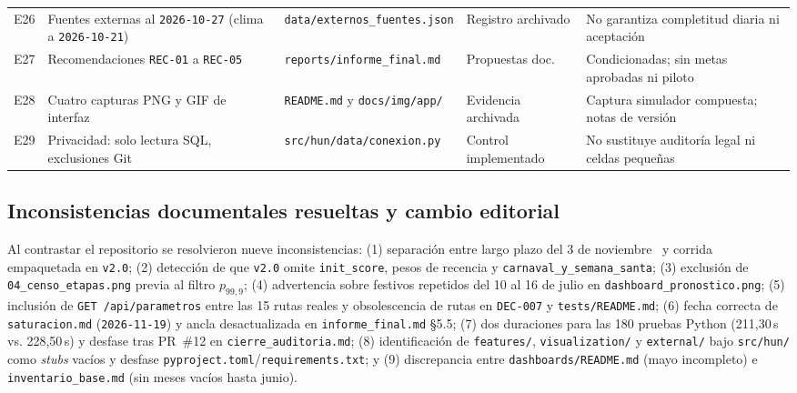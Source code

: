 \begin{table}[t]
\begin{tabularx}{\textwidth}{@{}L{0.04\textwidth} L{0.27\textwidth} L{0.24\textwidth} L{0.15\textwidth} Y@{}}
E26 & Fuentes externas al \texttt{2026-10-27} (clima a \texttt{2026-10-21}) & \nolinkurl{data/externos_fuentes.json} & Registro archivado & No garantiza completitud diaria ni aceptación \\
E27 & Recomendaciones \texttt{REC-01} a \texttt{REC-05} & \nolinkurl{reports/informe_final.md} & Propuestas doc. & Condicionadas; sin metas aprobadas ni piloto \\
E28 & Cuatro capturas PNG y GIF de interfaz & \nolinkurl{README.md} y \nolinkurl{docs/img/app/} & Evidencia archivada & Captura simulador compuesta; notas de versión \\
E29 & Privacidad: solo lectura SQL, exclusiones Git & \nolinkurl{src/hun/data/conexion.py} & Control implementado & No sustituye auditoría legal ni celdas pequeñas \\
\bottomrule
\end{tabularx}
\end{table}

\subsection{Inconsistencias documentales resueltas y cambio editorial}

Al contrastar el repositorio se resolvieron nueve inconsistencias: (1) separación entre largo plazo del 3 de noviembre~\cite{mediflow2026largoplazo} y corrida empaquetada en \texttt{v2.0}; (2) detección de que \texttt{v2.0} omite \texttt{init\_score}, pesos de recencia y \texttt{carnaval\_y\_semana\_santa}; (3) exclusión de \texttt{04\_censo\_etapas.png} previa al filtro $p_{99{,}9}$; (4) advertencia sobre festivos repetidos del 10 al 16 de julio en \texttt{dashboard\_pronostico.png}; (5) inclusión de \texttt{GET /api/parametros} entre las 15 rutas reales y obsolescencia de rutas en \texttt{DEC-007} y \texttt{tests/README.md}; (6) fecha correcta de \texttt{saturacion.md} (\texttt{2026-11-19}) y ancla desactualizada en \texttt{informe\_final.md} \S5.5; (7) dos duraciones para las 180 pruebas Python (211,30\,s vs. 228,50\,s) y desfase tras PR~\#12 en \texttt{cierre\_auditoria.md}; (8) identificación de \texttt{features/}, \texttt{visualization/} y \texttt{external/} bajo \texttt{src/hun/} como \textit{stubs} vacíos y desfase \texttt{pyproject.toml}/\texttt{requirements.txt}; y (9) discrepancia entre \texttt{dashboards/README.md} (mayo incompleto) e \texttt{inventario\_base.md} (sin meses vacíos hasta junio).


